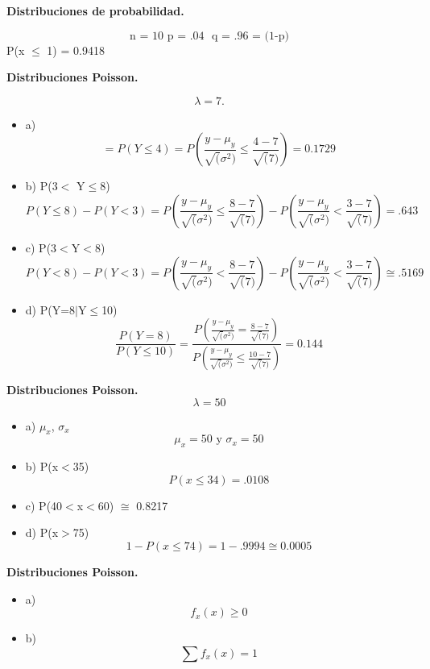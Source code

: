 \documentclass{../oxmathproblems}
\begin{document}
\begin{questions}

\miquestion\textbf {Distribuciones de probabilidad.}

$$ \text {n = 10 } 
\text {p = .04 }
\text { q = .96 = (1-p)} 
$$
P(x $\leq$ 1) = 0.9418

\miquestion\textbf{Distribuciones Poisson.}

$$ \lambda = 7. $$
 
 \begin{itemize}
\item  a) 
$$ 
 = P( Y \leq 4) = P( \frac{y- \mu_y}{\sqrt(\sigma^2)} \leq \frac{4-7}{\sqrt(7)}) 
 = 0.1729
$$
\item  b) P(3$<$ Y$\leq$8)
$$ P(Y \leq 8) - P(Y < 3)
=  P( \frac{y- \mu_y}{\sqrt(\sigma^2)} \leq \frac{8-7}{\sqrt(7)}) -  P( \frac{y- \mu_y}{\sqrt(\sigma^2)} < \frac{3-7}{\sqrt(7)}) = .643
$$

\item  c) P(3$<$Y$<$8)
$$ P(Y < 8) - P(Y < 3)
=  P( \frac{y- \mu_y}{\sqrt(\sigma^2)} < \frac{8-7}{\sqrt(7)}) -  P( \frac{y- \mu_y}{\sqrt(\sigma^2)} < \frac{3-7}{\sqrt(7)}) \cong .5169
$$ 
\item  d) P(Y=8$\mid$Y$\leq$10)
$$ \frac{P( Y=8)}{P( Y \leq 10)} =  \frac{P(\frac{y- \mu_y}{\sqrt(\sigma^2)} =  \frac{8-7}{\sqrt(7)})}{P( \frac{y- \mu_y}{\sqrt(\sigma^2)} \leq \frac{10-7}{\sqrt(7)})} = 0.144
$$
\end{itemize}

\miquestion\textbf{Distribuciones Poisson. }
$$ \lambda = 50 $$  
\begin{itemize}
\item a) $\mu_x$, $\sigma_x$
$$ \mu_x = 50 \text{ y } \sigma_x = 50 $$
\item  b) P(x$<$35)
$$ P(x \leq 34) = .0108 $$
\item  c) P(40$<$x$<$60) $\cong$ 0.8217

\item  d) P(x$>$75)
$$ 1- P( x \leq 74) = 1 - .9994 \cong 0.0005 $$ 
\end{itemize}

\miquestion\textbf{Distribuciones Poisson. }

\begin{itemize}
\item a) $$ f_x (x) \geq 0 $$ 
\item  b) $$ \sum f_x (x) = 1 $$
\end{itemize}


\end{questions}
\end{document}
